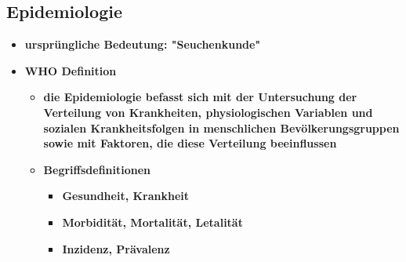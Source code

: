 \subsection{Epidemiologie}
	\begin{itemize}
		\item \textbf{ursprüngliche Bedeutung: "Seuchenkunde"}
		\item \textbf{WHO Definition}
			\begin{itemize}
				\item \textbf{die Epidemiologie befasst sich mit der Untersuchung der Verteilung von Krankheiten, physiologischen Variablen und sozialen Krankheitsfolgen in menschlichen Bevölkerungsgruppen sowie mit Faktoren, die diese Verteilung beeinflussen}
				\item \textbf{Begriffsdefinitionen}
					\begin{itemize}
						\item \textbf{Gesundheit, Krankheit}
						\item \textbf{Morbidität, Mortalität, Letalität}
						\item \textbf{Inzidenz, Prävalenz}
					\end{itemize}
		\end{itemize}
	\end{itemize}

